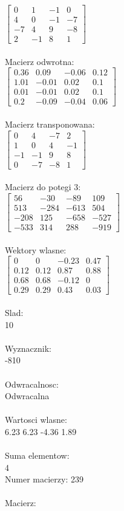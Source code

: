 \documentclass[a4paper,12pt]{article}
\begin{document}
$\begin{bmatrix} 0&1&-1&0\\4&0&-1&-7\\-7&4&9&-8\\2&-1&8&1 \end{bmatrix}$
\\
\\
Macierz odwrotna:\\

$\begin{bmatrix} 0.36&0.09&-0.06&0.12\\1.01&-0.01&0.02&0.1\\0.01&-0.01&0.02&0.1\\0.2&-0.09&-0.04&0.06 \end{bmatrix}$
\\
\\
Macierz transponowana:\\

$\begin{bmatrix} 0&4&-7&2\\1&0&4&-1\\-1&-1&9&8\\0&-7&-8&1 \end{bmatrix}$
\\
\\
Macierz do potegi 3:\\

$\begin{bmatrix} 56&-30&-89&109\\513&-284&-613&504\\-208&125&-658&-527\\-533&314&288&-919 \end{bmatrix}$
\\
\\
Wektory wlasne:\\

$\begin{bmatrix} 0&0&-0.23&0.47\\0.12&0.12&0.87&0.88\\0.68&0.68&-0.12&0\\0.29&0.29&0.43&0.03 \end{bmatrix}$
\\
\\
Slad:\\
10
\\
\\
Wyznacznik:\\
-810
\\
\\
Odwracalnosc:\\
Odwracalna
\\
\\
Wartosci wlasne:\\
6.23 6.23 -4.36 1.89
\\
\\
Suma elementow:\\
4
\\
\newpage
Numer macierzy:
239
\\
\\
Macierz:\\
\end{document}
